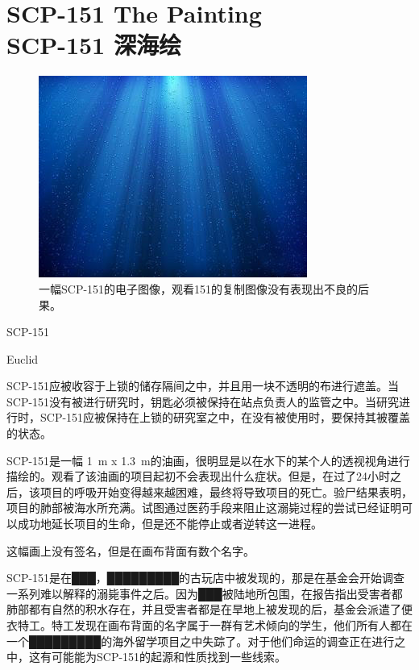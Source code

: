 \chapter[SCP-151 深海绘]{
    SCP-151 The Painting\\
    SCP-151 深海绘
}

\label{chap:SCP-151}

\begin{figure}[H]
    \centering
    \includegraphics[width=0.5\linewidth]{images/SCP.151.jpg}
    \caption*{一幅SCP-151的电子图像，观看151的复制图像没有表现出不良的后果。}
\end{figure}

SCP-151

Euclid

SCP-151应被收容于上锁的储存隔间之中，并且用一块不透明的布进行遮盖。当SCP-151没有被进行研究时，钥匙必须被保持在站点负责人的监管之中。当研究进行时，SCP-151应被保持在上锁的研究室之中，在没有被使用时，要保持其被覆盖的状态。

SCP-151是一幅 1 m x 1.3 m的油画，很明显是以在水下的某个人的透视视角进行描绘的。观看了该油画的项目起初不会表现出什么症状。但是，在过了24小时之后，该项目的呼吸开始变得越来越困难，最终将导致项目的死亡。验尸结果表明，项目的肺部被海水所充满。试图通过医药手段来阻止这溺毙过程的尝试已经证明可以成功地延长项目的生命，但是还不能停止或者逆转这一进程。

这幅画上没有签名，但是在画布背面有数个名字。

SCP-151是在███，█████████的古玩店中被发现的，那是在基金会开始调查一系列难以解释的溺毙事件之后。因为███被陆地所包围，在报告指出受害者都肺部都有自然的积水存在，并且受害者都是在旱地上被发现的后，基金会派遣了便衣特工。特工发现在画布背面的名字属于一群有艺术倾向的学生，他们所有人都在一个█████████的海外留学项目之中失踪了。对于他们命运的调查正在进行之中，这有可能能为SCP-151的起源和性质找到一些线索。

